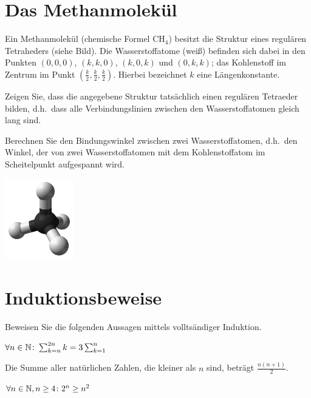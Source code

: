 \documentclass{scrartcl}
\begin{document}
\maketitle


\section{Das Methanmolekül}
Ein Methanmolekül (chemische Formel $\mathrm{CH}_4$) besitzt die Struktur eines regulären Tetraheders (siehe Bild).
Die Wasserstoffatome (weiß) befinden sich dabei in den Punkten $(0,0,0)$, $(k,k,0)$, $(k,0,k)$ und $(0,k,k)$; das Kohlenstoff im Zentrum im Punkt $(\frac{k}{2},\frac{k}{2},\frac{k}{2})$.
Hierbei bezeichnet $k$ eine Längenkonstante.
\begin{subex}
  \item Zeigen Sie, dass die angegebene Struktur tatsächlich einen regulären Tetraeder bilden, d.h.\ dass alle Verbindungslinien zwischen den Wasserstoffatomen gleich lang sind.
  \item Berechnen Sie den Bindungswinkel zwischen zwei Wasserstoffatomen, d.h.\ den Winkel, der von zwei Wasserstoffatomen mit dem Kohlenstoffatom im Scheitelpunkt aufgespannt wird.
\end{subex}

\begin{center}
  \includegraphics[width=3cm]{img/methan.png}
\end{center}




\section{Induktionsbeweise}
Beweisen Sie die folgenden Aussagen mittels volltsändiger Induktion.
\begin{subex}
  \item $\forall n \in \mathbb{N}\colon \sum_{k = n}^{2n} k = 3 \sum_{k=1}^n$
  \item Die Summe aller natürlichen Zahlen, die kleiner als $n$ sind, beträgt $\frac{n(n+1)}{2}$.
  \item $\forall n \in \mathbb{N}, n \ge 4\colon 2^n \ge n^2$
\end{subex}
\end{document}
